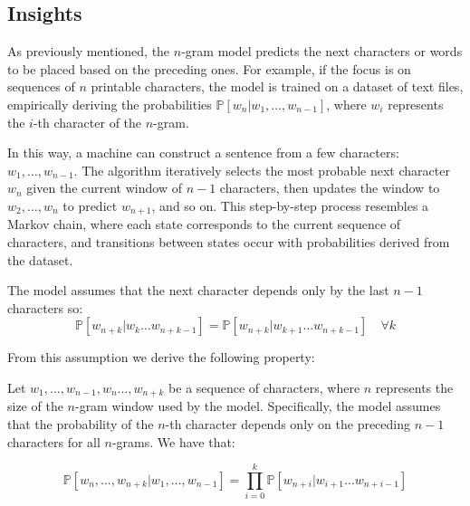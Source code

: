 \subsection{Insights}
As previously mentioned, the $n$-gram model predicts the next characters or words to be placed based on the preceding ones. For example, if the focus is on sequences of $n$ printable characters, the model is trained on a dataset of text files, empirically deriving the probabilities $\mathbb{P}\left[w_n|w_1,\dots,w_{n-1}\right]$, where $w_i$ represents the $i$-th character of the $n$-gram.

\begin{toReview}
	\noindent In this way, a machine can construct a sentence from a few characters: $w_1,\ldots,w_{n-1}$. The algorithm iteratively selects the most probable next character $w_{n}$ given the current window of $n-1$ characters, then updates the window to $w_2,\ldots,w_{n}$ to predict $w_{n+1}$, and so on. This step-by-step process resembles a Markov chain, where each state corresponds to the current sequence of characters, and transitions between states occur with probabilities derived from the dataset.
\end{toReview}

\begin{modified}
\noindent The model assumes that the next character  depends only by the last $n-1$ characters so:
\begin{equation}
	\mathbb{P}\left[w_{n+k}|w_k\dots w_{n+k-1}\right] = \mathbb{P}\left[w_{n+k}|w_{k+1}\dots w_{n+k-1}\right] \quad \forall k
	\label{eq:ngram_model}
\end{equation}
\end{modified}
From this assumption we derive the following property:
\begin{proposition}
	\begin{modified}
		Let $w_1,\dots,w_{n-1},w_n\dots,w_{n+k}$ be a sequence of characters, where $n$ represents the size of the $n$-gram window used by the model. Specifically, the model assumes that the probability of the $n$-th character depends only on the preceding $n-1$ characters for all $n$-grams. We have that:
	\end{modified}
\begin{equation}
	\mathbb{P}\left[w_n,\dots,w_{n+k}|w_1,\dots,w_{n-1}\right] = \prod_{i=0}^{k}\mathbb{P}\left[w_{n+i}|w_{i+1}\dots w_{n+i-1}\right]
	\label{eq:ngram_model_prop}
\end{equation}
\end{proposition}

